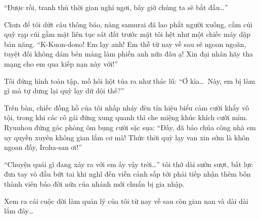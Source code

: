 \documentclass[../main.tex]{subfiles}
\begin{document}
``Được rồi, tranh thủ thời gian nghỉ ngơi, bây giờ chúng ta sẽ bắt đầu\dots''

Chưa để tôi dứt câu thông báo, nàng samurai đã lao phắt người xuống, cắm cúi quỳ rạp cúi gằm mặt liên tục sát đất trước mặt tôi hệt như một chiếc máy dập bản năng. ``K-Kuon-dono! Em lạy anh! Em thề từ nay về sau sẽ ngoan ngoãn, tuyệt đối không dám bén mảng làm phiền anh nữa đâu ạ! Xin đại nhân hãy tha mạng cho em qua kiếp nạn này với!''

Tôi đứng hình toàn tập, mồ hôi hột túa ra như thác lũ: ``Ơ kìa\dots\ Này, em bị làm gì mà tự dưng lại quỳ lạy dữ dội thế?''

Trên bàn, chiếc đồng hồ của tôi nhấp nháy đèn tín hiệu biểu cảm cười khẩy vô tội, trong khi các cô gái đứng xung quanh thì che miệng khúc khích cười mỉm. Ryuuhou đứng góc phòng ôm bụng cười sặc sụa: ``Đấy, đã bảo chúa công nhà em uy quyền xuyên không gian lắm cơ mà! Thức thời quỳ lạy van xin sớm là khôn ngoan đấy, Iroha-san ơi!''

``Chuyện quái gì đang xảy ra với em ấy vậy trời\dots'' tôi thở dài sườn sượt, bất lực đưa tay vò đầu bứt tai khi nghĩ đến viễn cảnh sắp tới phải tiếp nhận thêm bốn thành viên báo đời nữa của nhánh mới chuẩn bị gia nhập.

Xem ra cái cuộc đời làm quản lý của tôi từ nay về sau còn gian nan và dài dài lắm đây\dots
\end{document}
